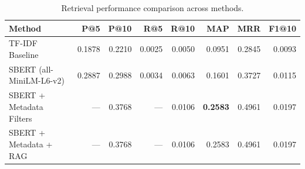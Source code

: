 \begin{table}[htbp]
\centering
\caption{Retrieval performance comparison across methods.}
\label{tab:retrieval_comparison}
\begin{tabular}{lrrrrrrr}
\toprule
Method & P@5 & P@10 & R@5 & R@10 & MAP & MRR & F1@10 \\
\midrule
TF-IDF Baseline & 0.1878 & 0.2210 & 0.0025 & 0.0050 & 0.0951 & 0.2845 & 0.0093 \\
SBERT (all-MiniLM-L6-v2) & 0.2887 & 0.2988 & 0.0034 & 0.0063 & 0.1601 & 0.3727 & 0.0115 \\
SBERT + Metadata Filters & — & 0.3768 & — & 0.0106 & \textbf{0.2583} & 0.4961 & 0.0197 \\
SBERT + Metadata + RAG & — & 0.3768 & — & 0.0106 & 0.2583 & 0.4961 & 0.0197 \\
\bottomrule
\end{tabular}
\end{table}
